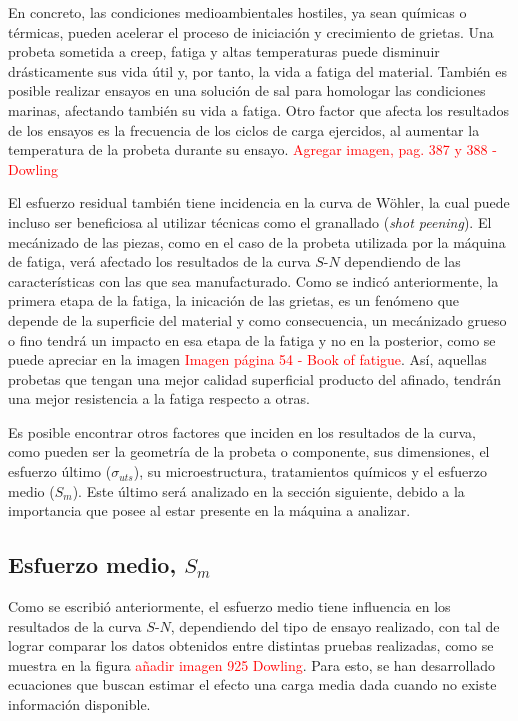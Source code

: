 En concreto, las condiciones medioambientales hostiles, ya sean químicas o térmicas, pueden acelerar el proceso de iniciación y crecimiento de grietas. Una probeta sometida a creep, fatiga y altas temperaturas puede disminuir drásticamente sus vida útil y, por tanto, la vida a fatiga del material. También es posible realizar ensayos en una solución de sal para homologar las condiciones marinas, afectando también su vida a fatiga. Otro factor que afecta los resultados de los ensayos es la frecuencia de los ciclos de carga ejercidos, al aumentar la temperatura de la probeta durante su ensayo. \textcolor{red}{Agregar imagen, pag. 387 y 388 - Dowling}

El esfuerzo residual también tiene incidencia en la curva de Wöhler, la cual puede incluso ser beneficiosa al utilizar técnicas como el granallado (\textit{shot peening}). El mecánizado de las piezas, como en el caso de la probeta utilizada por la máquina de fatiga, verá afectado los resultados de la curva $S$-$N$ dependiendo de las características con las que sea manufacturado. Como se indicó anteriormente, la primera etapa de la fatiga, la inicación de las grietas, es un fenómeno que depende de la superficie del material y como consecuencia, un mecánizado grueso o fino tendrá un impacto en esa etapa de la fatiga y no en la posterior, como se puede apreciar en la imagen \textcolor{red}{Imagen página 54 - Book of fatigue}. Así, aquellas probetas que tengan una mejor calidad superficial producto del afinado, tendrán una mejor resistencia a la fatiga respecto a otras.

Es posible encontrar otros factores que inciden en los resultados de la curva, como pueden ser la geometría de la probeta o componente, sus dimensiones, el esfuerzo último ($\sigma_{uts}$), su microestructura, tratamientos químicos y el esfuerzo medio ($S_m$). Este último será analizado en la sección siguiente, debido a la importancia que posee al estar presente en la máquina a analizar. 

\subsection{Esfuerzo medio, $S_m$}
Como se escribió anteriormente, el esfuerzo medio tiene influencia en los resultados de la curva $S$-$N$, dependiendo del tipo de ensayo realizado, con tal de lograr comparar los datos obtenidos entre distintas pruebas realizadas, como se muestra en la figura \textcolor{red}{añadir imagen 925  Dowling}. Para esto, se han desarrollado ecuaciones que buscan estimar el efecto una carga media dada cuando no existe información disponible.

